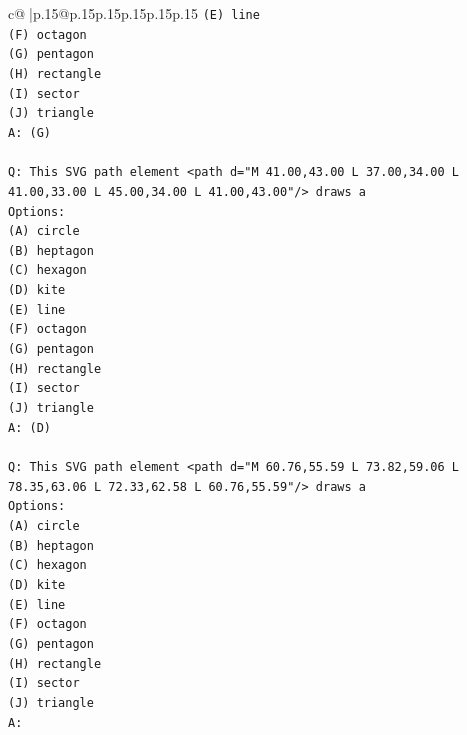 \documentclass{article}
\begin{document}
{\begin{supertabular}{c@{$\;$}|p{.15\linewidth}@{}p{.15\linewidth}p{.15\linewidth}p{.15\linewidth}p{.15\linewidth}p{.15\linewidth}}
{{{\texttt{(E) line} \\
\texttt{(F) octagon} \\
\texttt{(G) pentagon} \\
\texttt{(H) rectangle} \\
\texttt{(I) sector} \\
\texttt{(J) triangle} \\
\texttt{A: (G)} \\
\\ 
\texttt{Q: This SVG path element <path d="M 41.00,43.00 L 37.00,34.00 L 41.00,33.00 L 45.00,34.00 L 41.00,43.00"/> draws a} \\
\texttt{Options:} \\
\texttt{(A) circle} \\
\texttt{(B) heptagon} \\
\texttt{(C) hexagon} \\
\texttt{(D) kite} \\
\texttt{(E) line} \\
\texttt{(F) octagon} \\
\texttt{(G) pentagon} \\
\texttt{(H) rectangle} \\
\texttt{(I) sector} \\
\texttt{(J) triangle} \\
\texttt{A: (D)} \\
\\ 
\texttt{Q: This SVG path element <path d="M 60.76,55.59 L 73.82,59.06 L 78.35,63.06 L 72.33,62.58 L 60.76,55.59"/> draws a} \\
\texttt{Options:} \\
\texttt{(A) circle} \\
\texttt{(B) heptagon} \\
\texttt{(C) hexagon} \\
\texttt{(D) kite} \\
\texttt{(E) line} \\
\texttt{(F) octagon} \\
\texttt{(G) pentagon} \\
\texttt{(H) rectangle} \\
\texttt{(I) sector} \\
\texttt{(J) triangle} \\
\texttt{A:} \\
            }
        }
    }
     \\ \\


\end{supertabular}}
\end{document}
